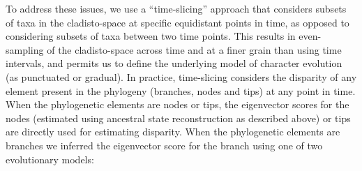 \documentclass[12pt,letterpaper]{article}
\begin{document}
To address these issues, we use a ``time-slicing'' approach that considers subsets of taxa in the cladisto-space at specific equidistant points in time, as opposed to considering subsets of taxa between two time points.
This results in even-sampling of the cladisto-space across time and at a finer grain than using time intervals, and permits us to define the underlying model of character evolution (as punctuated or gradual).  
In practice, time-slicing considers the disparity of any element present in the phylogeny (branches, nodes and tips) at any point in time.
When the phylogenetic elements are nodes or tips, the eigenvector scores for the nodes (estimated using ancestral state reconstruction as described above) or tips are directly used for estimating disparity.
When the phylogenetic elements are branches we inferred the eigenvector score for the branch using one of two evolutionary models:
\end{document}

